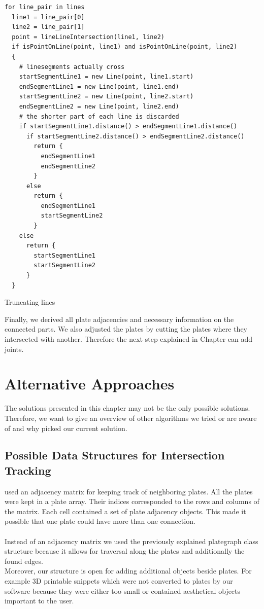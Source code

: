 \documentclass[../ClassicThesis.tex]{subfiles}
\begin{document}
\begin{listing}
\begin{verbatim}
for line_pair in lines
  line1 = line_pair[0]
  line2 = line_pair[1]
  point = lineLineIntersection(line1, line2)
  if isPointOnLine(point, line1) and isPointOnLine(point, line2)
  {
    # linesegments actually cross
    startSegmentLine1 = new Line(point, line1.start)
    endSegmentLine1 = new Line(point, line1.end)
    startSegmentLine2 = new Line(point, line2.start)
    endSegmentLine2 = new Line(point, line2.end)
    # the shorter part of each line is discarded
    if startSegmentLine1.distance() > endSegmentLine1.distance()
      if startSegmentLine2.distance() > endSegmentLine2.distance()
        return {
          endSegmentLine1
          endSegmentLine2
        }
      else
        return {
          endSegmentLine1
          startSegmentLine2
        }
    else
      return {
        startSegmentLine1
        startSegmentLine2
      }
  }
\end{verbatim}
\caption{Truncating lines}
\label{lst:truncateLines}
\end{listing}



Finally, we derived all plate adjacencies and necessary information on the connected parts. We also adjusted the plates by cutting the plates where they intersected with another. Therefore the next step explained in Chapter  can add joints.

\section{Alternative Approaches}
The solutions presented in this chapter may not be the only possible solutions. Therefore, we want to give an overview of other algorithms we tried or are aware of and why picked our current solution.

\subsection{Possible Data Structures for Intersection Tracking}
\citeauthor{master-thesis} used an adjacency matrix for keeping track of neighboring plates. All the plates were kept in a plate array. Their indices corresponded to the rows and columns of the matrix. Each cell contained a set of plate adjacency objects. This made it possible that one plate could have more than one connection.\\
\*\\
Instead of an adjacency matrix we used the previously explained plategraph class structure because it allows for traversal along the plates and additionally the found edges. \\
Moreover, our structure is open for adding additional objects beside plates. For example 3D printable snippets which were not converted to plates by our software because they were either too small or contained aesthetical objects important to the user.
\end{document}
